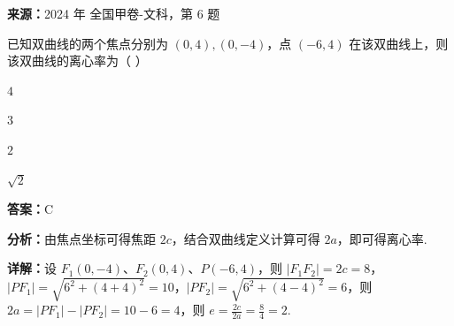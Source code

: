\begin{question}[points=5]
\textbf{来源：}2024 年 全国甲卷-文科，第 6 题\par
已知双曲线的两个焦点分别为 $(0,4), (0,-4)$，点 $(-6,4)$ 在该双曲线上，则该双曲线的离心率为（ ）
\begin{choices}
  \item $4$
  \item $3$
  \item $2$
  \item $\sqrt{2}$
\end{choices}
\begin{solution}
\textbf{答案：}C

\textbf{分析：}由焦点坐标可得焦距 $2c$，结合双曲线定义计算可得 $2a$，即可得离心率.

\textbf{详解：}设 $F_1(0,-4)$、$F_2(0,4)$、$P(-6,4)$，则 $|F_1F_2| = 2c = 8$，$|PF_1| = \sqrt{6^2 + (4+4)^2} = 10$，$|PF_2| = \sqrt{6^2 + (4-4)^2} = 6$，则 $2a = |PF_1| - |PF_2| = 10 - 6 = 4$，则 $e = \frac{2c}{2a} = \frac{8}{4} = 2$.
\end{solution}
\end{question}

